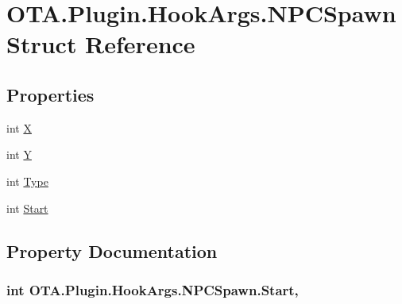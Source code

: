 \hypertarget{struct_o_t_a_1_1_plugin_1_1_hook_args_1_1_n_p_c_spawn}{}\section{O\+T\+A.\+Plugin.\+Hook\+Args.\+N\+P\+C\+Spawn Struct Reference}
\label{struct_o_t_a_1_1_plugin_1_1_hook_args_1_1_n_p_c_spawn}
\subsection*{Properties}
\begin{DoxyCompactItemize}
\item 
int \hyperlink{struct_o_t_a_1_1_plugin_1_1_hook_args_1_1_n_p_c_spawn_adb95441703d6e9cf1aa9f675d91f2e3e}{X}
\item 
int \hyperlink{struct_o_t_a_1_1_plugin_1_1_hook_args_1_1_n_p_c_spawn_a1fa1a26464e13964d81c7815dba2c264}{Y}
\item 
int \hyperlink{struct_o_t_a_1_1_plugin_1_1_hook_args_1_1_n_p_c_spawn_a3ecc50200fda7aa41146847c2e03e1e5}{Type}
\item 
int \hyperlink{struct_o_t_a_1_1_plugin_1_1_hook_args_1_1_n_p_c_spawn_a615b18eebc5c950c4fba4610ab9567ee}{Start}
\end{DoxyCompactItemize}


\subsection{Property Documentation}
\hypertarget{struct_o_t_a_1_1_plugin_1_1_hook_args_1_1_n_p_c_spawn_a615b18eebc5c950c4fba4610ab9567ee}{}
\subsubsection[{Start}]{\setlength{\rightskip}{0pt plus 5cm}int O\+T\+A.\+Plugin.\+Hook\+Args.\+N\+P\+C\+Spawn.\+Start\hspace{0.3cm}{\ttfamily [get]}, {\ttfamily [set]}}\label{struct_o_t_a_1_1_plugin_1_1_hook_args_1_1_n_p_c_spawn_a615b18eebc5c950c4fba4610ab9567ee}
\hypertarget{struct_o_t_a_1_1_plugin_1_1_hook_args_1_1_n_p_c_spawn_a3ecc50200fda7aa41146847c2e03e1e5}{}
